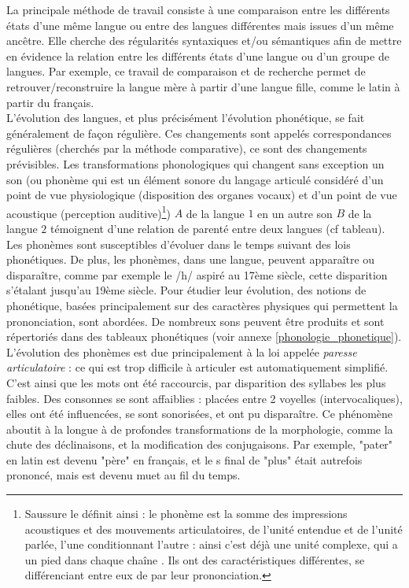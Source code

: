 \documentclass[12pt, twoside]{report}
\begin{document}
La principale méthode de travail consiste à une comparaison entre les différents états d'une même langue ou entre des langues différentes mais issues d'un même ancêtre. Elle cherche des régularités syntaxiques et/ou sémantiques afin de mettre en évidence la relation entre les différents états d'une langue ou d'un groupe de langues. Par exemple, ce travail de comparaison et de recherche permet de retrouver/reconstruire la langue mère à partir d'une langue fille, comme le latin à partir du français.\\

L'évolution des langues, et plus précisément l'évolution phonétique, se fait généralement de façon régulière. Ces changements sont appelés correspondances régulières (cherchés par la méthode comparative), ce sont des changements prévisibles. Les transformations phonologiques qui changent sans exception un son (ou phonème qui est un élément sonore du langage articulé considéré d'un point de vue physiologique (disposition des organes vocaux) et d'un point de vue acoustique (perception auditive)\footnote{Saussure le définit ainsi : \og le phonème est la somme des impressions acoustiques et des mouvements articulatoires, de l'unité entendue et de l'unité parlée, l'une  conditionnant l'autre : ainsi c'est déjà une unité complexe, qui a un pied dans chaque chaîne \fg{} \autocite{saussure}. Ils ont des caractéristiques différentes, se différenciant entre eux de par leur prononciation.}) $A$ de la langue $1$ en un autre son $B$ de la langue $2$ témoignent d'une relation de parenté entre deux langues (cf tableau).\\
\indent Les phonèmes sont susceptibles d'évoluer dans le temps suivant des \og lois phonétiques\fg. De plus, les phonèmes, dans une langue, peuvent apparaître ou disparaître, comme par exemple le /h/ aspiré au 17ème siècle, cette disparition s'étalant jusqu'au 19ème siècle. Pour étudier leur évolution, des notions de phonétique, basées principalement sur des caractères physiques qui permettent la prononciation, sont abordées. De nombreux sons peuvent être produits et sont répertoriés dans des tableaux phonétiques \autocite{saussure} (voir annexe \ref{phonologie_phonetique}).\\
L'évolution des phonèmes est due principalement à la loi appelée \og \textit{paresse articulatoire} \fg{} : ce qui est trop difficile à articuler est automatiquement simplifié. C'est ainsi que les mots ont été raccourcis, par disparition des syllabes les plus faibles. Des consonnes se sont affaiblies : placées entre 2 voyelles (intervocaliques), elles ont été influencées, se sont sonorisées, et ont pu disparaître. Ce phénomène aboutit à la longue à de profondes transformations de la morphologie, comme la chute des déclinaisons, et la modification des conjugaisons. Par exemple, "pater" en latin est devenu "père" en français, et le \og s\fg{} final de "plus" était autrefois prononcé, mais est devenu muet au fil du temps.\\
\end{document}
